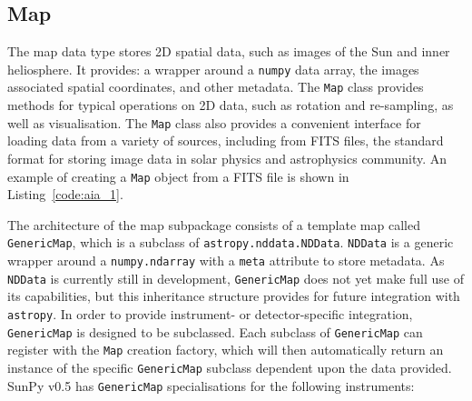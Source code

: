 \subsection{Map}\label{ssec:map}
The map data type stores 2D spatial data, such as images of the Sun and 
inner heliosphere. It provides: a wrapper around a \texttt{numpy} data array, 
the images associated spatial coordinates, and other metadata. The \texttt{Map} 
class provides methods for typical operations on 2D data, such as rotation and 
re-sampling, as well as visualisation.
The \texttt{Map} class also provides a convenient interface for loading data 
from a variety of sources, including from FITS files, the standard format for storing image data in solar physics and astrophysics community. 
An example of creating a \texttt{Map} object from a FITS file is shown in 
Listing~\ref{code:aia_1}.

The architecture of the map subpackage consists of a template map called
\texttt{GenericMap}, which is a subclass of \texttt{astropy.nddata.NDData}. 
\texttt{NDData} is a generic wrapper around a \texttt{numpy.ndarray} with a 
\texttt{meta} attribute to store metadata.
As \texttt{NDData} is currently still in development, \texttt{GenericMap} does 
not yet make full use of its capabilities, but this inheritance structure 
provides for future integration with \texttt{astropy}. In order to provide 
instrument- or detector-specific integration, \texttt{GenericMap} is designed
to be subclassed. Each subclass of \texttt{GenericMap} can register 
with the \texttt{Map} creation factory, which will then automatically return an instance
of the specific \texttt{GenericMap} subclass dependent upon the data provided. 
SunPy v0.5 has \texttt{GenericMap} specialisations for the following 
instruments: 


